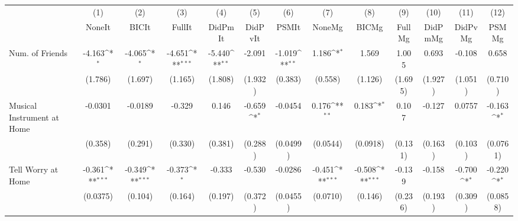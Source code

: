 {
\def\sym#1{\ifmmode^{#1}\else\(^{#1}\)\fi}
\begin{tabular}{l*{12}{c}}
\toprule
            &\multicolumn{1}{c}{(1)}&\multicolumn{1}{c}{(2)}&\multicolumn{1}{c}{(3)}&\multicolumn{1}{c}{(4)}&\multicolumn{1}{c}{(5)}&\multicolumn{1}{c}{(6)}&\multicolumn{1}{c}{(7)}&\multicolumn{1}{c}{(8)}&\multicolumn{1}{c}{(9)}&\multicolumn{1}{c}{(10)}&\multicolumn{1}{c}{(11)}&\multicolumn{1}{c}{(12)}\\
            &\multicolumn{1}{c}{NoneIt}&\multicolumn{1}{c}{BICIt}&\multicolumn{1}{c}{FullIt}&\multicolumn{1}{c}{DidPmIt}&\multicolumn{1}{c}{DidPvIt}&\multicolumn{1}{c}{PSMIt}&\multicolumn{1}{c}{NoneMg}&\multicolumn{1}{c}{BICMg}&\multicolumn{1}{c}{FullMg}&\multicolumn{1}{c}{DidPmMg}&\multicolumn{1}{c}{DidPvMg}&\multicolumn{1}{c}{PSMMg}\\
\midrule
Num. of Friends&      -4.163\sym{*}  &      -4.065\sym{*}  &      -4.651\sym{***}&      -5.440\sym{**} &      -2.091         &      -1.019\sym{**} &       1.186\sym{*}  &       1.569         &       1.005         &       0.693         &      -0.108         &       0.658         \\
            &     (1.786)         &     (1.697)         &     (1.165)         &     (1.808)         &     (1.932)         &     (0.383)         &     (0.558)         &     (1.126)         &     (1.695)         &     (1.927)         &     (1.051)         &     (0.710)         \\
\addlinespace
Musical Instrument at Home&     -0.0301         &     -0.0189         &      -0.329         &       0.146         &      -0.659\sym{*}  &     -0.0454         &       0.176\sym{**} &       0.183\sym{*}  &       0.107         &      -0.127         &      0.0757         &      -0.163\sym{*}  \\
            &     (0.358)         &     (0.291)         &     (0.330)         &     (0.381)         &     (0.288)         &    (0.0499)         &    (0.0544)         &    (0.0918)         &     (0.131)         &     (0.163)         &     (0.103)         &    (0.0761)         \\
\addlinespace
Tell Worry at Home&      -0.361\sym{***}&      -0.349\sym{***}&      -0.373\sym{*}  &      -0.333         &      -0.530         &     -0.0286         &      -0.451\sym{***}&      -0.508\sym{***}&      -0.139         &      -0.158         &      -0.700\sym{*}  &      -0.220\sym{*}  \\
            &    (0.0375)         &     (0.104)         &     (0.164)         &     (0.197)         &     (0.372)         &    (0.0455)         &    (0.0710)         &     (0.146)         &     (0.236)         &     (0.193)         &     (0.309)         &    (0.0858)         \\

\end{tabular}}

